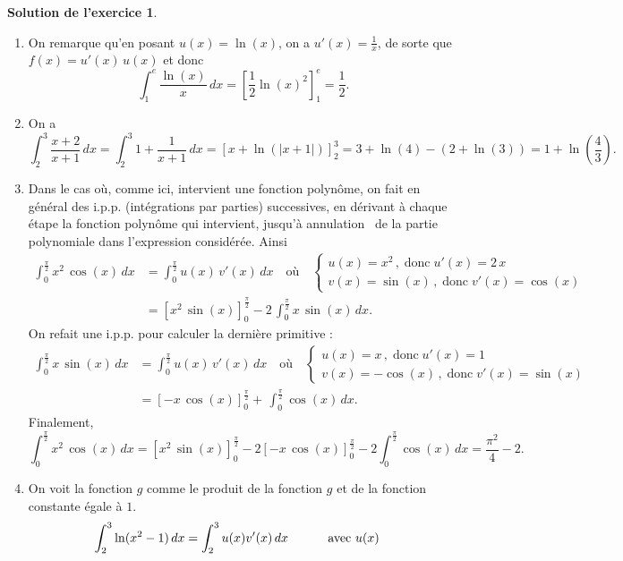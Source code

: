 \documentclass[a4paper, 11pt,openany]{article}%
\theoremstyle{plain}
\theoremstyle{definition}
\newtheorem{sol}{Solution de l'exercice}
\theoremstyle{remark}
\begin{document}
\begin{sol}
\begin{enumerate}
\item On remarque qu'en posant $u(x)= \ln (x)$, on a $u'(x)=\frac{1}{x}$, de sorte que $f(x)=u'(x)\,u(x)$ et donc
\[ \int_1^e \frac{\ln(x)}{x} \, dx = \left[ \frac{1}{2} \ln(x)^2 \right]_1^e = \frac{1}{2}.\]
\item On a
\[ \int_2^3 \frac{x+2}{x+1} \, dx = \int_2^3 1 + \frac{1}{x+1} \, dx = \left[ x + \ln(|x+1|) \right]_2^3 = 3 + \ln(4) - (2 + \ln(3)) = 1 + \ln \left( \frac{4}{3} \right).\]
\item Dans le cas où, comme ici, intervient une fonction polynôme, on fait en général des i.p.p. (intégrations par
parties) successives, en dérivant à chaque étape la fonction polynôme qui intervient, jusqu'à
\og annulation \fg\, de la partie polynomiale dans l'expression considérée. Ainsi
\begin{align*}\int_0^{\frac{\pi}{2}} x^2\, \cos(x)\, dx &= \int_0^{\frac{\pi}{2}} u(x)\, v'(x)\, dx \quad \text{où}\quad \begin{cases}
 u(x)=x^2\,,\;\text{donc}\; u'(x)=2\, x\\
 v(x)=\sin(x)\,,\;\text{donc}\;v'(x)=\cos(x)\end{cases}\\
&=\left[ x^2\, \sin(x)\right]_0^{\frac{\pi}{2}}-2\,\int_0^{\frac{\pi}{2}} x\,\sin(x)\, dx.
\end{align*}
On refait une i.p.p. pour calculer la dernière primitive :
\begin{align*}\int_0^{\frac{\pi}{2}} x\, \sin(x)\, dx &= \int_0^{\frac{\pi}{2}} u(x)\, v'(x)\, dx \quad \text{où}\quad \begin{cases}
 u(x)=x\,,\;\text{donc}\; u'(x)=1\\
 v(x)=-\cos(x)\,,\;\text{donc}\;v'(x)=\sin(x)\end{cases}\\
&= \left[ -x\, \cos(x) \right]_0^{\frac{\pi}{2}} +\,\int_0^{\frac{\pi}{2}} \cos(x)\, dx.
\end{align*}
Finalement, 
\[
\int_0^{\frac{\pi}{2}} x^2\, \cos(x)\, dx =\left[ x^2\, \sin(x)\right]_0^{\frac{\pi}{2}}-2\left[ -x\, \cos(x) \right]_0^{\frac{\pi}{2}} -2\int_0^{\frac{\pi}{2}} \cos(x)\, dx = \frac{\pi^2}{4} - 2.\]
\item On voit la fonction $g$ comme le produit de la fonction $g$ et de la fonction constante égale à $1$.
 \begin{align*}
   \int_2^3 \ln(x^2-1)\, dx &= \int_2^3 u(x) v'(x)\, dx \mbox{\hspace{1cm} avec }u(x)

\end{align*}
\end{enumerate}
\end{sol}
\end{document}
